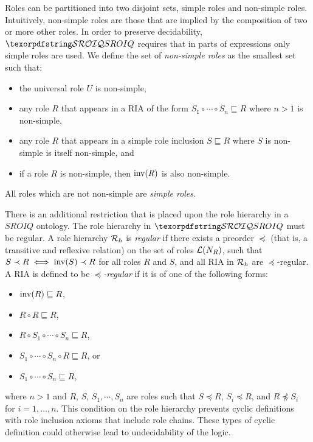 Roles can be partitioned into two disjoint sets, simple roles and non-simple roles. Intuitively, non-simple roles are those that are implied by the composition of two or more other roles. In order to preserve decidability, $\SROIQ$ requires that in parts of expressions only simple roles are used. We define the set of \emph{non-simple roles} as the smallest set such that:
\begin{itemize}
  \item the universal role $U$ is non-simple,
  \item any role $R$ that appears in a RIA of the form $S_1 \circ \cdots \circ S_n \sqsubseteq R$ where $n > 1$ is non-simple,
  \item any role $R$ that appears in a simple role inclusion $S \sqsubseteq R$ where $S$ is non-simple is itself non-simple, and
  \item if a role $R$ is non-simple, then $\operatorname{inv}(R)$ is also non-simple.
\end{itemize}
All roles which are not non-simple are \emph{simple roles}.

\begin{example}
\end{example}

There is an additional restriction that is placed upon the role hierarchy in a $SROIQ$ ontology. The role hierarchy in $\SROIQ$ must be regular. A role hierarchy $\mathcal{R}_h$ is \emph{regular} if there exists a preorder $\preceq$ (that is, a transitive and reflexive relation) on the set of roles $\mathcal{L}(N_R)$, such that $S \prec R \iff \operatorname{inv}(S) \prec R$ for all roles $R$ and $S$, and all RIA in $\mathcal{R}_h$ are $\preceq$-regular. A RIA is defined to be $\preceq$\emph{-regular} if it is of one of the following forms:
\begin{itemize}
  \item $\operatorname{inv}(R) \sqsubseteq R$,
  \item $R \circ R \sqsubseteq R$,
  \item $R \circ S_1 \circ \cdots \circ S_n \sqsubseteq R$,
  \item $S_1 \circ \cdots \circ S_n \circ R \sqsubseteq R$, or
  \item $S_1 \circ \cdots \circ S_n \sqsubseteq R$,
\end{itemize}
where $n > 1$ and $R$, $S$, $S_1, \cdots, S_n$ are roles such that $S \preceq R$, $S_i \preceq R$, and $R \not\preceq S_i$ for $i = 1, \dots, n$. This condition on the role hierarchy prevents cyclic definitions with role inclusion axioms that include role chains. These types of cyclic definition could otherwise lead to undecidability of the logic.

